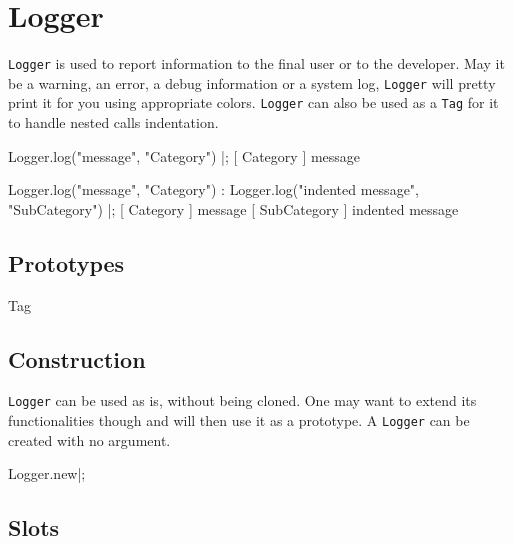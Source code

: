 
\section{Logger}

\lstinline|Logger| is used to report information to the final user or to the
developer. May it be a warning, an error, a debug information or a system
log, \lstinline|Logger| will pretty print it for you using appropriate
colors. \lstinline|Logger| can also be used as a \lstinline|Tag| for it to
handle nested calls indentation.

\begin{urbiunchecked}
Logger.log("message", "Category") |;
[       Category        ] message

Logger.log("message", "Category") :
{
  Logger.log("indented message", "SubCategory")
}|;
[       Category        ] message
[      SubCategory      ]   indented message
\end{urbiunchecked}

\subsection{Prototypes}
\begin{refObjects}
\item[Tag]
\end{refObjects}

\subsection{Construction}

\lstinline|Logger| can be used as is, without being cloned. One may want to
extend its functionalities though and will then use it as a prototype. A
\lstinline|Logger| can be created with no argument.

\begin{urbiscript}
Logger.new|;
\end{urbiscript}

\subsection{Slots}

